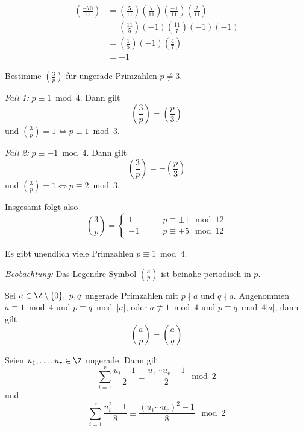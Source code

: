 \begin{exmp*}
	\begin{align*}
		\left( \frac{-70}{11} \right) &= \left( \frac{5}{11} \right) \left( \frac{7}{11} \right) \left( \frac{-1}{11} \right) \left( \frac{2}{11} \right)\\
		&= \left( \frac{11}{5} \right) (-1) \left( \frac{11}{7} \right) (-1)(-1)\\
		&= \left( \frac{1}{5} \right) (-1) \left( \frac{4}{7} \right)\\
		&= -1
	\end{align*}
\end{exmp*}

\begin{exmp*}
	Bestimme $\left(\frac{3}{p}\right)$ für ungerade Primzahlen $p \neq 3$.
	
	\emph{Fall 1:} $p \equiv 1 \bmod 4$. Dann gilt
	\[ \left(\frac{3}{p}\right) = \left(\frac{p}{3}\right) \]
	und $\left(\frac{3}{p}\right) = 1 \iff p \equiv 1 \bmod 3$.
	
	\emph{Fall 2:} $p \equiv -1 \bmod 4$. Dann gilt
	\[ \left(\frac{3}{p}\right) = -\left(\frac{p}{3}\right) \]
	und $\left(\frac{3}{p}\right) = 1 \iff p \equiv 2 \bmod 3$.
	
	Insgesamt folgt also
	\[ \left(\frac{3}{p}\right) = \begin{cases}
		1 \qquad & p \equiv \pm 1 \mod 12\\
		-1 \qquad & p \equiv \pm 5 \mod 12
	\end{cases} \]
\end{exmp*}

\begin{thm}\autolabel
	Es gibt unendlich viele Primzahlen $p \equiv 1 \bmod 4$.
\end{thm}

\emph{Beobachtung:} Das Legendre Symbol $\left(\frac{a}{p}\right)$ ist beinahe periodisch in $p$.\video

\begin{thm}\autolabel
	Sei $a \in \Z\setminus\{0\},\ p,q $ ungerade Primzahlen mit $p \nmid a$ und $q \nmid a$. Angenommen $a \equiv 1 \bmod 4$ und $p \equiv q \bmod |a|$, oder $a \not\equiv 1 \bmod 4$ und $p \equiv q \bmod 4|a|$, dann gilt
	\[ \left(\frac{a}{p}\right) = \left(\frac{a}{q}\right) \]
\end{thm}

\begin{lem}\autolabel
	Seien $u_1,\dotsc,u_r \in \Z$ ungerade. Dann gilt
	\[ \sum_{i=1}^r \frac{u_i -1}{2} \equiv \frac{u_1 \dotsm u_r - 1}{2} \mod 2 \]
	und
	\[ \sum_{i=1}^r \frac{u_i^2 -1}{8} \equiv \frac{(u_1\dotsm u_r)^2-1}{8} \mod 2 \]
\end{lem}

